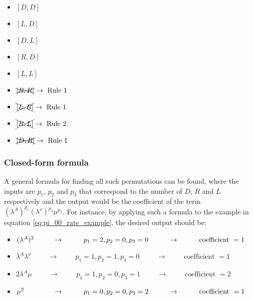 \begin{multicols}{2}
    \begin{itemize}
        \item \([D, D]\)
        \item \([L, D]\)
        \item \([D, L]\)
        \item \([R, D]\)
        \item \([L, L]\)
        \item \(\xcancel{[R, R]} \rightarrow \text{ Rule 1}\) 
        \item \(\xcancel{[L, R]} \rightarrow \text{ Rule 1}\)
        \item \(\xcancel{[R, L]} \rightarrow \text{ Rule 2}\)
        \item \(\xcancel{[D, R]} \rightarrow \text{ Rule 1}\)
    \end{itemize}
\end{multicols}


\subsubsection{Closed-form formula}
A general formula for finding all such permutations can be found, where the inputs are \( p_1\), \(p_2\) and \(p_3\) that correspond to the number of \(D\), \(R\) and \(L\) respectively and the output would be the coefficient of the term \((\lambda^A)^{p_1} (\lambda^o)^{p_2} \mu^{p_3}\). 
For instance, by applying such a formula to the example in equation \ref{eq:pi_00_rate_example}, the desired output should be:

\begin{itemize}
    \item \((\lambda^A)^2 \hspace{0.95cm} \rightarrow \hspace{1cm} p_1 = 2, p_2=0, p_3=0 \hspace{1cm} \rightarrow \hspace{1cm} \text{coefficient } = 1\)
    \item \(\lambda^A \lambda^o \hspace{1cm} \rightarrow \hspace{1cm} p_1 = 1, p_2=1, p_3=0 \hspace{1cm} \rightarrow \hspace{1cm} \text{coefficient } = 1\)
    \item \(2 \lambda^A \mu \hspace{1cm} \rightarrow \hspace{1cm} p_1 = 1, p_2=0, p_3=1 \hspace{1cm} \rightarrow \hspace{1cm} \text{coefficient } = 2\)
    \item \(\mu^2 \hspace{1.45cm} \rightarrow \hspace{1cm} p_1=0, p_2=0, p_3=2 \hspace{1cm} \rightarrow \hspace{1cm} \text{coefficient } = 1\)
\end{itemize}

